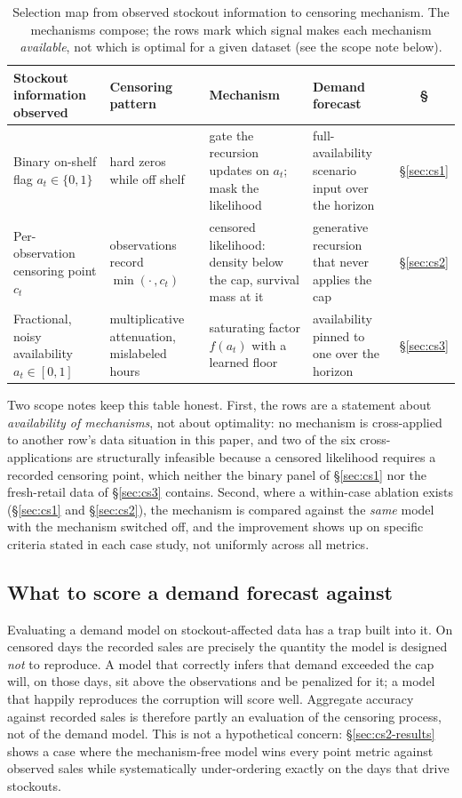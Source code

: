 \begin{table}[t]
\centering
\small
\begin{tabular}{p{}p{}p{}p{}c}
\toprule
Stockout information observed & Censoring pattern & Mechanism & Demand forecast & \S \\
\midrule
Binary on-shelf flag $a_t \in \{0,1\}$ & hard zeros while off shelf & gate the recursion updates on $a_t$; mask the likelihood & full-availability scenario input over the horizon & \S\ref{sec:cs1} \\
\addlinespace
Per-observation censoring point $c_t$ & observations record $\min(\cdot\,, c_t)$ & censored likelihood: density below the cap, survival mass at it & generative recursion that never applies the cap & \S\ref{sec:cs2} \\
\addlinespace
Fractional, noisy availability $a_t \in [0,1]$ & multiplicative attenuation, mislabeled hours & saturating factor $f(a_t)$ with a learned floor & availability pinned to one over the horizon & \S\ref{sec:cs3} \\
\bottomrule
\end{tabular}
\caption{Selection map from observed stockout information to censoring mechanism. The mechanisms compose; the rows mark which signal makes each mechanism \emph{available}, not which is optimal for a given dataset (see the scope note below).}
\label{tab:taxonomy}
\end{table}

Two scope notes keep this table honest. First, the rows are a statement about \emph{availability of mechanisms}, not about optimality: no mechanism is cross-applied to another row's data situation in this paper, and two of the six cross-applications are structurally infeasible because a censored likelihood requires a recorded censoring point, which neither the binary panel of \S\ref{sec:cs1} nor the fresh-retail data of \S\ref{sec:cs3} contains. Second, where a within-case ablation exists (\S\ref{sec:cs1} and \S\ref{sec:cs2}), the mechanism is compared against the \emph{same} model with the mechanism switched off, and the improvement shows up on specific criteria stated in each case study, not uniformly across all metrics.

\subsection{What to score a demand forecast against}\label{sec:scoring}

Evaluating a demand model on stockout-affected data has a trap built into it. On censored days the recorded sales are precisely the quantity the model is designed \emph{not} to reproduce. A model that correctly infers that demand exceeded the cap will, on those days, sit above the observations and be penalized for it; a model that happily reproduces the corruption will score well. Aggregate accuracy against recorded sales is therefore partly an evaluation of the censoring process, not of the demand model. This is not a hypothetical concern: \S\ref{sec:cs2-results} shows a case where the mechanism-free model wins every point metric against observed sales while systematically under-ordering exactly on the days that drive stockouts.

